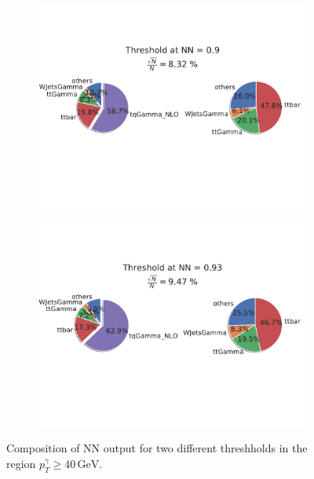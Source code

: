 \begin{figure}
    \centering
    \begin{subfigure}[b]{0.6\textwidth}
       \includegraphics[width=1\linewidth]{Plots/composition9phA40.pdf}
    \end{subfigure}
    
    \begin{subfigure}[b]{0.6\textwidth}
       \includegraphics[width=1\linewidth]{Plots/compositionTenphA40.pdf}
    \end{subfigure}
    \caption{Composition of NN output for two different threshholds in the region $p_T^\gamma \geq 40\,\si{\giga\electronvolt}$. }
    \label{fig:phptA40}
\end{figure}

